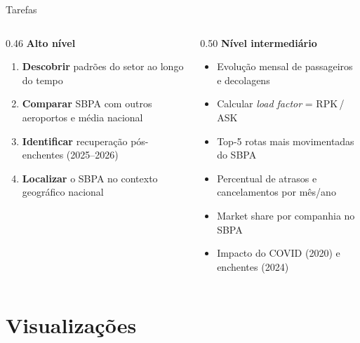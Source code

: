 \documentclass[aspectratio=169]{beamer}
\begin{document}
\begin{frame}[t]{Tarefas}
  \begin{columns}[T]
    \begin{column}{0.46\textwidth}
      \textbf{Alto nível}
      \begin{enumerate}\setlength{\itemsep}{5pt}
        \item \textbf{Descobrir} padrões do setor ao longo do tempo
        \item \textbf{Comparar} SBPA com outros aeroportos e média nacional
        \item \textbf{Identificar} recuperação pós-enchentes (2025--2026)
        \item \textbf{Localizar} o SBPA no contexto geográfico nacional
      \end{enumerate}
    \end{column}
    \begin{column}{0.50\textwidth}
      \textbf{Nível intermediário}
      \begin{itemize}\setlength{\itemsep}{3pt}
        \item Evolução mensal de passageiros e decolagens
        \item Calcular \textit{load factor} = RPK\,/\,ASK
        \item Top-5 rotas mais movimentadas do SBPA
        \item Percentual de atrasos e cancelamentos por mês/ano
        \item Market share por companhia no SBPA
        \item Impacto do COVID (2020) e enchentes (2024)
      \end{itemize}
    \end{column}
  \end{columns}
\end{frame}

\section{Visualizações}
\end{document}
